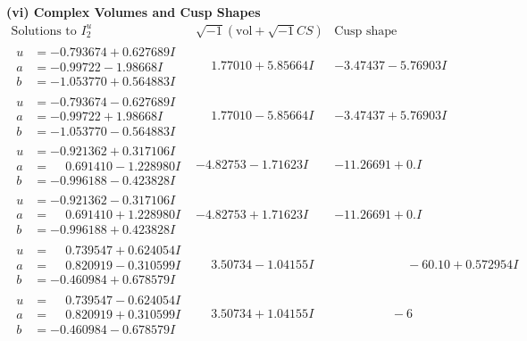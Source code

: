 \documentclass[1p]{elsarticle_modified}
\theoremstyle{definition}
\newcommand{\I}{\sqrt{-1}}
\begin{document}
\newpage\flushleft \textbf{(vi) Complex Volumes and Cusp Shapes}
$$\begin{array}{c|c|c}  
\text{Solutions to }I^u_{2}& \I (\text{vol} + \sqrt{-1}CS) & \text{Cusp shape}\\
 \hline 
\begin{aligned}
u &= -0.793674 + 0.627689 I \\
a &= -0.99722 - 1.98668 I \\
b &= -1.053770 + 0.564883 I\end{aligned}
 & \phantom{-}1.77010 + 5.85664 I & -3.47437 - 5.76903 I \\ \hline\begin{aligned}
u &= -0.793674 - 0.627689 I \\
a &= -0.99722 + 1.98668 I \\
b &= -1.053770 - 0.564883 I\end{aligned}
 & \phantom{-}1.77010 - 5.85664 I & -3.47437 + 5.76903 I \\ \hline\begin{aligned}
u &= -0.921362 + 0.317106 I \\
a &= \phantom{-}0.691410 - 1.228980 I \\
b &= -0.996188 - 0.423828 I\end{aligned}
 & -4.82753 - 1.71623 I & -11.26691 + 0. I\phantom{ +0.000000I} \\ \hline\begin{aligned}
u &= -0.921362 - 0.317106 I \\
a &= \phantom{-}0.691410 + 1.228980 I \\
b &= -0.996188 + 0.423828 I\end{aligned}
 & -4.82753 + 1.71623 I & -11.26691 + 0. I\phantom{ +0.000000I} \\ \hline\begin{aligned}
u &= \phantom{-}0.739547 + 0.624054 I \\
a &= \phantom{-}0.820919 - 0.310599 I \\
b &= -0.460984 + 0.678579 I\end{aligned}
 & \phantom{-}3.50734 - 1.04155 I & \phantom{-0.000000 -}     -6
0. 10   + 0.572954 I \\ \hline\begin{aligned}
u &= \phantom{-}0.739547 - 0.624054 I \\
a &= \phantom{-}0.820919 + 0.310599 I \\
b &= -0.460984 - 0.678579 I\end{aligned}
 & \phantom{-}3.50734 + 1.04155 I & \phantom{-0.000000 }      -6

\end{array}$$
\end{document}
